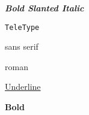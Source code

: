 \documentclass{article}
\begin{document}
\textit{\textsl{\textbf{Bold Slanted Italic}}}

\texttt{TeleType}

\textsf{sans serif}

\textrm{roman}

\underline{Underline}

\textbf{Bold}
\end{document}
